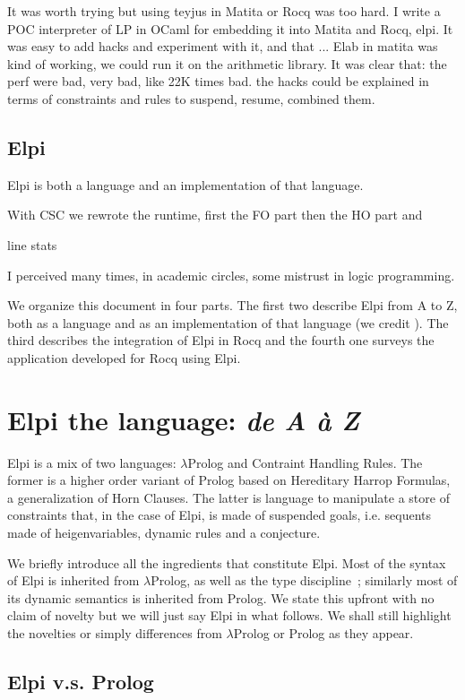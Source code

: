 \documentclass[a4paper, 11pt]{book}
\begin{document}
It was worth trying but using teyjus in Matita or Rocq was too hard.
I write a POC interpreter of LP in OCaml for embedding it into
Matita and Rocq, elpi. It was easy to add hacks and experiment with
it, and that ... Elab in matita was kind of working, we could run
it on the arithmetic library. It was clear that:
the perf were bad, very bad, like 22K times bad.
the hacks could be explained in terms of constraints and rules to
suspend, resume, combined them.


\section{Elpi}
Elpi is both a language and an implementation of that language.

With CSC we rewrote the runtime, first the FO part then the HO part
and 

line stats

I perceived many times, in academic circles, some mistrust in logic programming.


We organize this document in four parts. The first two describe Elpi from
A to Z, both as a language and as an implementation of that language (we credit
\cite{ridoux1998lambda}). The third describes the integration of Elpi in Rocq
and the fourth one surveys the application developed for Rocq using Elpi.


\chapter{Elpi the language: \emph{de A \`a Z}}

Elpi is a mix of two languages: $\lambda$Prolog and Contraint Handling Rules.
The former is a higher order variant of Prolog based on
Hereditary Harrop Formulas, a generalization of Horn Clauses.
The latter is language to manipulate a store of constraints that,
in the case of Elpi, is made of suspended goals, i.e. sequents
made of heigenvariables, dynamic rules and a conjecture.

We briefly introduce all the ingredients that constitute Elpi.
Most of the syntax of Elpi is inherited from $\lambda$Prolog, as well
as the type discipline~\cite{Miller_Nadathur_2012}; similarly most of
its dynamic semantics is inherited from Prolog.
We state this upfront with no claim of novelty but we will just say Elpi in what
follows. We shall still highlight the novelties or simply differences from
$\lambda$Prolog or Prolog as they appear.

\section{Elpi v.s. Prolog}
\end{document}
